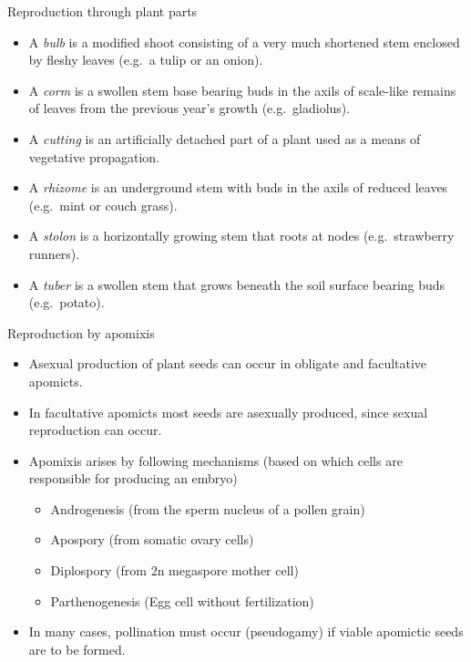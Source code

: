 \documentclass[11pt,ignorenonframetext,aspectratio=169]{beamer}
\providecommand{\tightlist}{%
  \setlength{\itemsep}{0pt}\setlength{\parskip}{0pt}}
\begin{document}
\begin{frame}{Reproduction through plant parts}
\protect\hypertarget{reproduction-through-plant-parts}{}
\begin{itemize}
\tightlist
\item
  A \emph{bulb} is a modified shoot consisting of a very much shortened
  stem enclosed by fleshy leaves (e.g.~a tulip or an onion).
\item
  A \emph{corm} is a swollen stem base bearing buds in the axils of
  scale-like remains of leaves from the previous year's growth
  (e.g.~gladiolus).
\item
  A \emph{cutting} is an artificially detached part of a plant used as a
  means of vegetative propagation.
\item
  A \emph{rhizome} is an underground stem with buds in the axils of
  reduced leaves (e.g.~mint or couch grass).
\item
  A \emph{stolon} is a horizontally growing stem that roots at nodes
  (e.g.~strawberry runners).
\item
  A \emph{tuber} is a swollen stem that grows beneath the soil surface
  bearing buds (e.g.~potato).
\end{itemize}
\end{frame}

\begin{frame}{Reproduction by apomixis}
\protect\hypertarget{reproduction-by-apomixis}{}
\begin{itemize}
\tightlist
\item
  Asexual production of plant seeds can occur in obligate and
  facultative apomicts.
\item
  In facultative apomicts most seeds are asexually produced, since
  sexual reproduction can occur.
\item
  Apomixis arises by following mechanisms (based on which cells are
  responsible for producing an embryo)

  \begin{itemize}
  \tightlist
  \item
    Androgenesis (from the sperm nucleus of a pollen grain)
  \item
    Apospory (from somatic ovary cells)
  \item
    Diplospory (from 2n megaspore mother cell)
  \item
    Parthenogenesis (Egg cell without fertilization)
  \end{itemize}
\item
  In many cases, pollination must occur (pseudogamy) if viable apomictic
  seeds are to be formed.
\end{itemize}
\end{frame}
\end{document}
